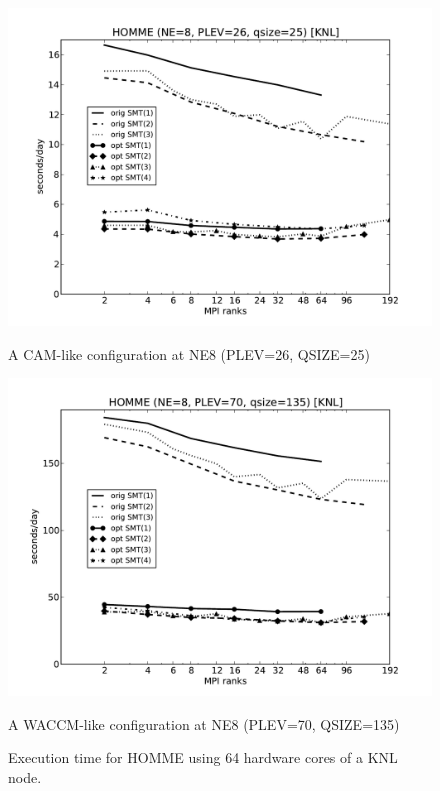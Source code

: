 \begin{figure}
\centering
\begin{minipage}{1.\textwidth}
  \centering
  \includegraphics[width=1.\linewidth]{figures/homme-knl-ne8-cam.pdf}
 \caption{A CAM-like configuration at NE8 (PLEV=26, QSIZE=25)}
  \label{fig:homme-knl-ne8-cam}
\end{minipage}
\begin{minipage}{1.\textwidth}
   \centering
   \includegraphics[width=1.\linewidth]{figures/homme-knl-ne8-waccm.pdf}
   \caption{A WACCM-like configuration at NE8 (PLEV=70, QSIZE=135)}
   \label{fig:homme-knl-ne8-waccm}
\end{minipage}
\caption{Execution time for HOMME using 64 hardware cores of a KNL node.}
\label{fig:test}
\end{figure}
